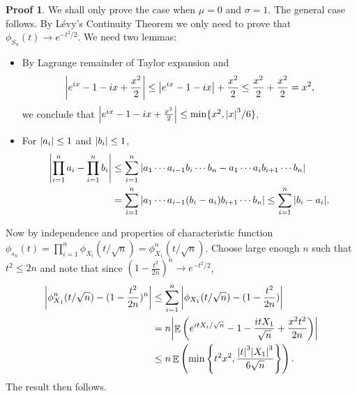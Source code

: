 \documentclass[hidelinks,11pt]{article}
\theoremstyle{definition}
\theoremstyle{dotless}
\newtheorem{prop}{Proof}[section]
\theoremstyle{remark}
\DeclareMathOperator{\E}{\mathbb{E}}
\DeclareMathOperator{\1}{\mathbf{1}}
\begin{document}
\begin{prop}
We shall only prove the case when $\mu=0$ and $\sigma=1$. The general case follows. By Lévy's Continuity Theorem we only need to prove that $\phi_{S_n}(t)\to e^{-t^2/2}$. We need two lemmas:\begin{itemize}
    \item By Lagrange remainder of Taylor expansion and
    \[\abs{e^{ix}-1-ix+\frac{x^2}{2}}\leq\abs{e^{ix}-1-ix}+\frac{x^2}{2}\leq\frac{x^2}{2}+\frac{x^2}{2}=x^2,\]
    we conclude that $\abs{e^{ix}-1-ix+\frac{x^2}{2}}\leq\min\{x^2,\abs{x}^3/6\}$.
    \item For $\abs{a_i}\leq1$ and $\abs{b_i}\leq1$,
    \begin{align*}
    \abs{\prod_{i=1}^na_i-\prod_{i=1}^nb_i}&\leq\sum_{i=1}^n\abs{a_1\cdots a_{i-1}b_i\cdots b_n-a_1\cdots a_ib_{i+1}\cdots b_n}\\
    &=\sum_{i=1}^n\abs{a_1\cdots a_{i-1}(b_i-a_i)b_{i+1}\cdots b_n}\leq\sum_{i=1}^n\abs{b_i-a_i}.
    \end{align*}
\end{itemize}
Now by independence and properties of characteristic function $\phi_{s_n}(t)=\prod_{i=1}^n\phi_{X_i}(t/\sqrt{n})=\phi_{X_1}^n(t/\sqrt{n})$. Choose large enough $n$ such that $t^2\leq2n$ and note that since $(1-\frac{t^2}{2n})^n\to e^{-t^2/2}$,
\begin{align*}
    \abs{\phi_{X_1}^n(t/\sqrt{n})-(1-\frac{t^2}{2n})^n}&\leq\sum_{i=1}^n\abs{\phi_{X_1}(t/\sqrt{n})-(1-\frac{t^2}{2n})}\\
    &=n\abs{\E\left(e^{itX_i/\sqrt{n}}-1-\frac{itX_1}{\sqrt{n}}+\frac{x^2t^2}{2n}\right)}\\
    &\leq n\E\left(\min\left\{t^2x^2,\frac{\abs{t}^3\abs{X_1}^3}{6\sqrt{n}}\right\}\right).
\end{align*}
The result then follows.
\end{prop}
\end{document}
